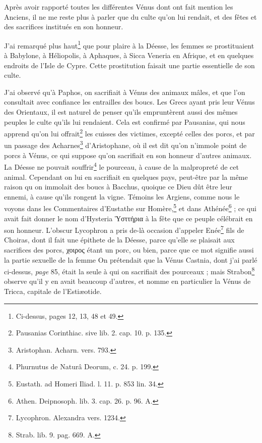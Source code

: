 \documentclass[a4paper, 18pt, oneside]{article}
\begin{document}
Après avoir rapporté toutes les différentes Vénus dont ont fait mention les Anciens, il ne me reste plus à parler que du culte qu'on lui rendait, et des fêtes et des sacrifices institués en son honneur.

J'ai remarqué plus haut\footnote{Ci-dessus, pages 12, 13, 48 et 49.} que pour plaire à la Déesse, les femmes se prostituaient à Babylone, à Héliopolis, à Aphaques, à Sicca Veneria en Afrique, et en quelques endroits de l'Isle de Cypre. Cette prostitution faisait une partie essentielle de son culte.

J'ai observé qu'à Paphos, on sacrifiait à Vénus des animaux mâles, et que l'on consultait avec confiance les entrailles des boucs. Les Grecs ayant pris leur Vénus des Orientaux, il est naturel de penser qu'ils empruntèrent aussi des mêmes peuples le culte qu'ils lui rendaient. Cela est confirmé par Pausanias, qui nous apprend qu'on lui offrait\footnote{Pausanias Corinthiac. sive lib. 2. cap. 10. p. 135.} les cuisses des victimes, excepté celles des porcs, et par un passage des Acharnes\footnote{Aristophan. Acharn. vers. 793.} d'Aristophane, où il est dit qu'on n'immole point de porcs à Vénus, ce qui suppose qu'on sacrifiait en son honneur d'autres animaux. La Déesse ne pouvait souffrir\footnote{Phurnutus de Naturâ Deorum, c. 24. p. 199.} le pourceau, à cause de la malpropreté de cet animal. Cependant on lui en sacrifiait en quelques pays, peut-être par la même raison qu on immolait des boucs à Bacchus, quoique ce Dieu dût être leur ennemi, à cause qu'ils rongent la vigne. Témoins les Argiens, comme nous le voyons dans les Commentaires d'Eustathe sur Homère,\footnote{Eustath. ad Homeri Iliad. l. 11. p. 853 lin. 34.} et dans Athénée\footnote{Athen. Deipnosoph. lib. 3. cap. 26. p. 96. A.} ; ce qui avait fait donner le nom d'Hysteria Ὑσττήρια à la fête que ce peuple célébrait en son honneur. L'obscur Lycophron a pris de-là occasion d'appeler Enée\footnote{Lycophron. Alexandra vers. 1234.} fils de Choiras, dont il fait une épithete de la Déesse, parce qu'elle se plaisait aux sacrifices des porcs, χοιρος étant un porc, ou bien, parce que ce mot signifie aussi la partie sexuelle de la femme On prétendait que la Vénus Castnia, dont j'ai parlé ci-dessus, \emph{page} 85, était la seule à qui on sacrifiait des pourceaux ; mais Strabon\footnote{Strab. lib. 9. pag. 669. A.} observe qu'il y en avait beaucoup d'autres, et nomme en particulier la Vénus de Tricca, capitale de l'Estiæotide.
\end{document}
